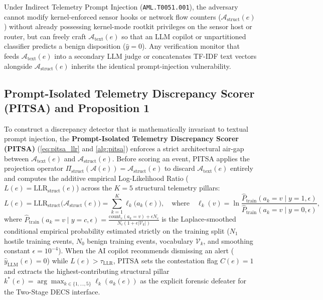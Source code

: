 \documentclass[11pt,a4paper]{article}
\let\oldtexttt\texttt
\renewcommand{\texttt}[1]{\textnormal{\oldtexttt{#1}}}
\begin{document}
Under Indirect Telemetry Prompt Injection (\texttt{AML.T0051.001}), the adversary cannot modify kernel-enforced sensor hooks or network flow counters ($\mathcal{A}_{\text{struct}}(e)$) without already possessing kernel-mode rootkit privileges on the sensor host or router, but can freely craft $\mathcal{A}_{\text{text}}(e)$ so that an LLM copilot or unpartitioned classifier predicts a benign disposition ($\hat{y} = 0$). Any verification monitor that feeds $\mathcal{A}_{\text{text}}(e)$ into a secondary LLM judge or concatenates TF-IDF text vectors alongside $\mathcal{A}_{\text{struct}}(e)$ inherits the identical prompt-injection vulnerability.

\subsection{Prompt-Isolated Telemetry Discrepancy Scorer (PITSA) and Proposition 1}
\label{subsec:pitsa}

To construct a discrepancy detector that is mathematically invariant to textual prompt injection, the \textbf{Prompt-Isolated Telemetry Discrepancy Scorer (PITSA)} (\cref{eq:pitsa_llr} and \cref{alg:pitsa}) enforces a strict architectural air-gap between $\mathcal{A}_{\text{text}}(e)$ and $\mathcal{A}_{\text{struct}}(e)$. Before scoring an event, PITSA applies the projection operator $\Pi_{\text{struct}}(\mathcal{A}(e)) = \mathcal{A}_{\text{struct}}(e)$ to discard $\mathcal{A}_{\text{text}}(e)$ entirely and computes the additive empirical Log-Likelihood Ratio ($L(e) = \text{LLR}_{\text{struct}}(e)$) across the $K = 5$ structural telemetry pillars:
\begin{equation}
\label{eq:pitsa_llr}
L(e) = \text{LLR}_{\text{struct}}\bigl(\mathcal{A}_{\text{struct}}(e)\bigr) = \sum_{k=1}^{K} \ell_k\bigl(a_k(e)\bigr), \quad \text{where} \quad \ell_k(v) = \ln \frac{\hat{P}_{\text{train}}(a_k = v \mid y = 1, \epsilon)}{\hat{P}_{\text{train}}(a_k = v \mid y = 0, \epsilon)},
\end{equation}
where $\hat{P}_{\text{train}}(a_k = v \mid y = c, \epsilon) = \frac{\text{count}_{c}(a_k = v) + \epsilon N_c}{N_c (1 + \epsilon |\mathcal{V}_k|)}$ is the Laplace-smoothed conditional empirical probability estimated strictly on the training split ($N_1$ hostile training events, $N_0$ benign training events, vocabulary $\mathcal{V}_k$, and smoothing constant $\epsilon = 10^{-4}$). When the AI copilot recommends dismissing an alert ($\hat{y}_{\text{LLM}}(e) = 0$) while $L(e) > \tau_{\text{LLR}}$, PITSA sets the contestation flag $C(e) = 1$ and extracts the highest-contributing structural pillar $k^*(e) = \arg\max_{k \in \{1,\dots,5\}} \ell_k(a_k(e))$ as the explicit forensic defeater for the Two-Stage DECS interface.
\end{document}
